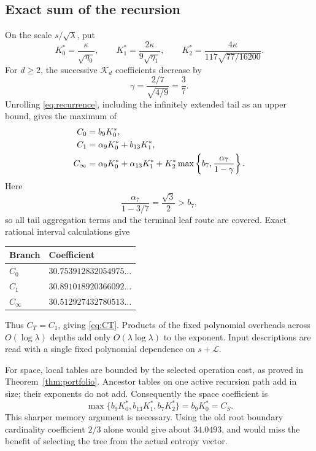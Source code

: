 \documentclass[11pt]{article}
\theoremstyle{remark}\newtheorem{remark}[theorem]{Remark}
\newcommand{\K}{\mathcal K}
\begin{document}
\subsection{Exact sum of the recursion}
On the scale $s/\sqrt\lambda$, put
\[
 K_0^*=\frac{\kappa}{\sqrt{\eta_0}},\qquad
 K_1^*=\frac{2\kappa}{9\sqrt{\eta_1}},\qquad
 K_2^*=\frac{4\kappa}{117\sqrt{77/16200}}.
\]
For $d\ge2$, the successive $\K_d$ coefficients decrease by
\[
 \gamma=\frac{2/7}{\sqrt{4/9}}=\frac37.
\]
Unrolling \eqref{eq:recurrence}, including the infinitely extended tail as
an upper bound, gives the maximum of
\begin{align}
 C_0&=b_9K_0^*,\notag\\
 C_1&=\alpha_9K_0^*+b_{13}K_1^*,\notag\\
 C_\infty&=\alpha_9K_0^*+\alpha_{13}K_1^*
        +K_2^*\max\left\{b_7,\frac{\alpha_7}{1-\gamma}\right\}.
 \label{eq:threecosts}
\end{align}
Here
\[
 \frac{\alpha_7}{1-3/7}=\frac{\sqrt3}{2}>b_7,
\]
so all tail aggregation terms and the terminal leaf route are covered.
Exact rational interval calculations give
\begin{center}
\begin{tabular}{ll}
\toprule Branch & Coefficient\\\midrule
$C_0$ & $30.753912832054975\ldots$\\
$C_1$ & $30.891018920366092\ldots$\\
$C_\infty$ & $30.512927432780513\ldots$\\
\bottomrule
\end{tabular}
\end{center}
Thus $C_T=C_1$, giving \eqref{eq:CT}. Products of the fixed polynomial
overheads across $O(\log\lambda)$ depths add only
$O(\lambda\log\lambda)$ to the exponent. Input descriptions are read with
a single fixed polynomial dependence on $s+\mathcal L$.

For space, local tables are bounded by the selected operation cost, as proved
in Theorem~\ref{thm:portfolio}. Ancestor tables on one active recursion path
add in size; their exponents do not add. Consequently the space coefficient is
\[
 \max\{b_9K_0^*,b_{13}K_1^*,b_7K_2^*\}=b_9K_0^*=C_S.
\]
This sharper memory argument is necessary. Using the old root boundary
cardinality coefficient $2/3$ alone would give about $34.0493$, and would
miss the benefit of selecting the tree from the actual entropy vector.
\end{document}
